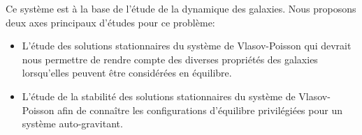 Ce système est à la base de l'étude de la dynamique des galaxies. Nous proposons deux axes principaux d'études pour ce problème:
\begin{itemize}

	\item L'étude des solutions stationnaires du système de Vlasov-Poisson qui devrait nous permettre de rendre compte des diverses propriétés des
		galaxies lorsqu'elles peuvent être considérées en équilibre.

	\item L'étude de la stabilité des solutions stationnaires du système de Vlasov-Poisson afin de connaître les configurations d'équilibre
		privilégiées pour un système auto-gravitant.

\end{itemize}


